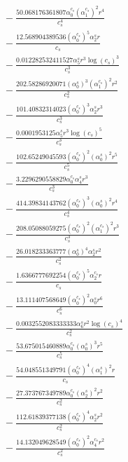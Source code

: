 \documentclass[10pt]{article}
\begin{document}
\begin{align*}
&{}  - \frac{50.068176361807 \alpha_{0}^{c_s} \left(\alpha_{1}^{c_s}\right)^{2} r^{4}}{c_{s}^{4}} \\
&{}  - \frac{12.568904389536 \left(\alpha_{0}^{c_s}\right)^{5} \alpha_{2}^s r}{c_{s}} \\
&{}  - \frac{0.012282532411527 \alpha_{5}^s r^{3} \log{\left(c_{s} \right)}^{3}}{c_{s}^{3}} \\
&{}  - \frac{202.58286920071 \left(\alpha_{0}^s\right)^{3} \left(\alpha_{1}^{c_s}\right)^{2} r^{2}}{c_{s}^{2}} \\
&{}  - \frac{101.40832314023 \left(\alpha_{0}^{c_s}\right)^{3} \alpha_{2}^s r^{3}}{c_{s}^{3}} \\
&{}  - \frac{0.0001953125 \alpha_{5}^s r^{3} \log{\left(c_{s} \right)}^{5}}{c_{s}^{3}} \\
&{}  - \frac{102.65249045593 \left(\alpha_{0}^{c_s}\right)^{2} \left(\alpha_{0}^s\right)^{2} r^{5}}{c_{s}^{5}} \\
&{}  - \frac{3.2296290558829 \alpha_{0}^{c_s} \alpha_{4}^s r^{3}}{c_{s}^{3}} \\
&{}  - \frac{414.39834143762 \left(\alpha_{0}^{c_s}\right)^{3} \left(\alpha_{0}^s\right)^{2} r^{4}}{c_{s}^{4}} \\
&{}  - \frac{208.05088059275 \left(\alpha_{0}^{c_s}\right)^{2} \left(\alpha_{1}^{c_s}\right)^{2} r^{3}}{c_{s}^{3}} \\
&{}  - \frac{26.018233363777 \left(\alpha_{0}^s\right)^{4} \alpha_{2}^s r^{2}}{c_{s}^{2}} \\
&{}  - \frac{1.6366777692254 \left(\alpha_{0}^{c_s}\right)^{5} \alpha_{2}^{c_s} r}{c_{s}} \\
&{}  - \frac{13.111407568649 \left(\alpha_{0}^{c_s}\right)^{2} \alpha_{0}^s r^{6}}{c_{s}^{6}} \\
&{}  - \frac{0.0032552083333333 \alpha_{6}^s r^{2} \log{\left(c_{s} \right)}^{4}}{c_{s}^{2}} \\
&{}  - \frac{53.675015460889 \alpha_{0}^{c_s} \left(\alpha_{0}^s\right)^{3} r^{5}}{c_{s}^{5}} \\
&{}  - \frac{54.048551349791 \left(\alpha_{0}^{c_s}\right)^{4} \left(\alpha_{1}^s\right)^{2} r}{c_{s}} \\
&{}  - \frac{27.373767349789 \alpha_{0}^{c_s} \left(\alpha_{2}^s\right)^{2} r^{2}}{c_{s}^{2}} \\
&{}  - \frac{112.61839377138 \left(\alpha_{0}^{c_s}\right)^{4} \alpha_{2}^s r^{2}}{c_{s}^{2}} \\
&{}  - \frac{14.132049628549 \left(\alpha_{0}^{c_s}\right)^{2} \alpha_{4}^{c_s} r^{2}}{c_{s}^{2}} \\

\end{align*}
\end{document}
